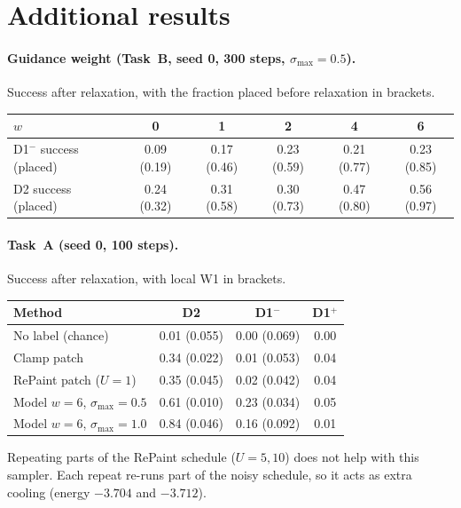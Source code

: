 \documentclass[10pt]{article}
\newcommand{\Dm}{D1$^{-}$}
\newcommand{\Dp}{D1$^{+}$}
\begin{document}
\appendix
\section{Additional results}
\label{app:extra}

\paragraph{Guidance weight (Task~B, seed 0, 300 steps, $\sigma_\text{max}=0.5$).} Success after relaxation, with the fraction placed before relaxation in brackets.

\begin{center}\small
\begin{tabular}{lccccc}
\toprule
$w$ & 0 & 1 & 2 & 4 & 6 \\
\midrule
\Dm{} success (placed) & 0.09 (0.19) & 0.17 (0.46) & 0.23 (0.59) & 0.21 (0.77) & 0.23 (0.85) \\
D2 success (placed) & 0.24 (0.32) & 0.31 (0.58) & 0.30 (0.73) & 0.47 (0.80) & 0.56 (0.97) \\
\bottomrule
\end{tabular}
\end{center}

\paragraph{Task~A (seed 0, 100 steps).} Success after relaxation, with local W1 in brackets.

\begin{center}\small
\begin{tabular}{lccc}
\toprule
Method & D2 & \Dm{} & \Dp{} \\
\midrule
No label (chance) & 0.01 (0.055) & 0.00 (0.069) & 0.00 \\
Clamp patch & 0.34 (0.022) & 0.01 (0.053) & 0.04 \\
RePaint patch ($U=1$) & 0.35 (0.045) & 0.02 (0.042) & 0.04 \\
Model $w=6$, $\sigma_\text{max}=0.5$ & 0.61 (0.010) & 0.23 (0.034) & 0.05 \\
Model $w=6$, $\sigma_\text{max}=1.0$ & 0.84 (0.046) & 0.16 (0.092) & 0.01 \\
\bottomrule
\end{tabular}
\end{center}

Repeating parts of the RePaint schedule ($U=5, 10$) does not help with this sampler. Each repeat re-runs part of the noisy schedule, so it acts as extra cooling (energy $-3.704$ and $-3.712$).
\end{document}
